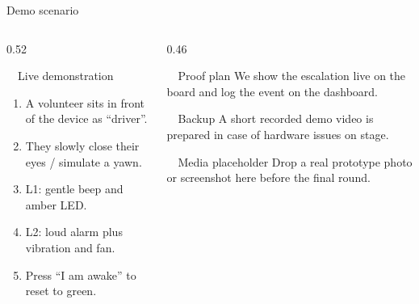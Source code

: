 \documentclass[aspectratio=169, 10pt]{beamer}
\begin{document}
\begin{frame}{Demo scenario}
  \begin{columns}[T]
    \begin{column}{0.52\textwidth}
      \begin{card}{\faVideo~~Live demonstration}
        \scriptsize
        \begin{enumerate}
          \item A volunteer sits in front of the device as ``driver''.
          \item They slowly close their eyes / simulate a yawn.
          \item L1: gentle beep and amber LED.
          \item L2: loud alarm plus vibration and fan.
          \item Press ``I am awake'' to reset to green.
        \end{enumerate}
      \end{card}
    \end{column}
    \begin{column}{0.46\textwidth}
      \begin{goldcard}{\faCheckCircle~~Proof plan}
        \scriptsize We show the escalation live on the board and log the event on the dashboard.
      \end{goldcard}
      \vspace{0.4em}
      \begin{alertcard}{\faExclamationTriangle~~Backup}
        \scriptsize A short recorded demo video is prepared in case of hardware issues on stage.
      \end{alertcard}
      \vspace{0.4em}
      \begin{card}{\faImage~~Media placeholder}
        \scriptsize Drop a real prototype photo or screenshot here before the final round.
      \end{card}
    \end{column}
  \end{columns}
\end{frame}
\end{document}
